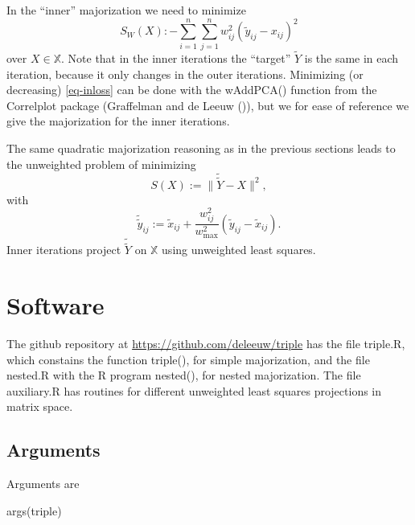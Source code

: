 \documentclass[
  12pt,
  letterpaper,
  DIV=11,
  numbers=noendperiod]{scrartcl}
\newenvironment{Shaded}{\begin{snugshade}}{\end{snugshade}}
\newcommand{\FunctionTok}[1]{\textcolor[rgb]{0.28,0.35,0.67}{#1}}
\newcommand{\NormalTok}[1]{\textcolor[rgb]{0.00,0.23,0.31}{#1}}
\newcommand{\sectionbreak}{\clearpage}
\begin{document}
In the ``inner'' majorization we need to minimize \begin{equation}
S_W(X):-\sum_{i=1}^n\sum_{j=1}^nw_{ij}^2(\tilde y_{ij}-x_{ij})^2\label{eq-inloss}
\end{equation} over \(X\in\mathbb{X}\). Note that in the inner
iterations the ``target'' \(\tilde Y\) is the same in each iteration,
because it only changes in the outer iterations. Minimizing (or
decreasing) \eqref{eq-inloss} can be done with the wAddPCA() function
from the Correlplot package ({Graffelman and de Leeuw}
()), but we for ease of
reference we give the majorization for the inner iterations.

The same quadratic majorization reasoning as in the previous sections
leads to the unweighted problem of minimizing \begin{equation}
S(X):=\|\tilde{\tilde Y}-X\|^2,
\end{equation} with \begin{equation}
\tilde{\tilde y}_{ij}:=\tilde x_{ij}+\frac{w_{ij}^2}{w^2_{\text{max}}}(\tilde y_{ij}-\tilde x_{ij}).
\end{equation} Inner iterations project \(\tilde{\tilde Y}\) on
\(\mathbb{X}\) using unweighted least squares.

\sectionbreak

\section{Software}\label{software}

The github repository at \url{https://github.com/deleeuw/triple} has the
file triple.R, which constains the function triple(), for simple
majorization, and the file nested.R with the R program nested(), for
nested majorization. The file auxiliary.R has routines for different
unweighted least squares projections in matrix space.

\subsection{Arguments}\label{arguments}

Arguments are

\begin{Shaded}
\begin{Highlighting}[]
\FunctionTok{args}\NormalTok{(triple)}
\end{Highlighting}
\end{Shaded}
\end{document}
